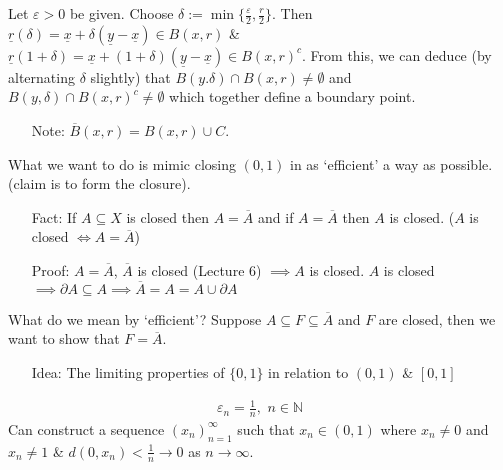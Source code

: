 \documentclass[10pt]{article}
\begin{document}
Let $\varepsilon>0$ be given. Choose $\delta:=\min\{\frac{\varepsilon}{2},\frac{r}{2}\}$. Then $\underline{r}(\delta)=\underline{x}+\delta(\underline{y}-\underline{x})\in B(x,r)$ \& $\underline{r}(1+\delta)=\underline{x}+(1+\delta)(\underline{y}-\underline{x})\in B(x,r)^{c}$. From this, we can deduce (by alternating $\delta$ slightly) that $B(y.\delta)\cap B(x,r)\neq\emptyset$ and $B(y,\delta)\cap B(x,r)^{c}\neq\emptyset$ which together define a boundary point.
\begin{itemize}
    \item[Note:] $\boxed{\overline{B}(x,r)=B(x,r)\cup C.}$ 
\end{itemize}
\newpage
What we want to do is mimic closing $(0,1)$ in as `efficient' a way as possible. (claim is to form the closure).
\begin{itemize}
    \item[Fact:] If $A\subseteq X$ is closed then $A=\overline{A}$ and if $A=\overline{A}$ then $A$ is closed.
    \subitem ($A$ is closed $\iff A=\overline{A}$)
    \item[Proof:] $A=\overline{A}$, $\overline{A}$ is closed (Lecture 6) $\implies A$ is closed.
    \subitem $A$ is closed $\implies\partial A\subseteq A\implies\overline{A}=A=A\cup\partial A$
\end{itemize}
What do we mean by `efficient'? Suppose $A\subseteq F\subseteq\overline{A}$ and $F$ are closed, then we want to show that $F=\overline{A}$.
\begin{itemize}
    \item[Idea:] The limiting properties of $\{0,1\}$ in relation to $(0,1)$ \& $[0,1]$ 
\end{itemize}
\begin{multicols}{2}

\begin{align*}
    \varepsilon_{n}=\frac{1}{n},\,\,n\in\mathbb{N}
\end{align*}
Can construct a sequence $(x_{n})_{n=1}^{\infty}$ such that $x_{n}\in(0,1)$ where $x_{n}\neq0$ and $x_{n}\neq1$ \& $d(0,x_{n})<\frac{1}{n}\to0$ as $n\to\infty$.
\end{multicols}
\end{document}
